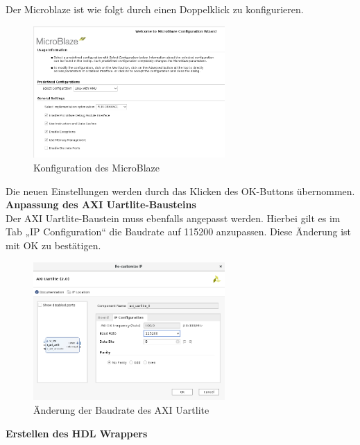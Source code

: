   Der Microblaze ist wie folgt durch einen Doppelklick zu konfigurieren.

\begin{figure}[H]
\centering
\includegraphics[width=0.65\textwidth]{Hauptteil/microkonf.png}
\caption{Konfiguration des MicroBlaze}\label{fig:mbschritt9}
\end{figure}
Die neuen Einstellungen werden durch das Klicken des OK-Buttons übernommen.\\

\textbf{Anpassung des AXI Uartlite-Bausteins}\\

Der AXI Uartlite-Baustein muss ebenfalls angepasst werden. Hierbei gilt es im Tab „IP Configuration“ die Baudrate auf 115200 anzupassen.
Diese Änderung ist mit OK zu bestätigen.\\

\begin{figure}[H]
\centering
\includegraphics[width=0.65\textwidth]{Hauptteil/Schritt10.png}
\caption{Änderung der Baudrate des AXI Uartlite}\label{fig:mbschritt10}
\end{figure}

\vspace{10mm}

\textbf{Erstellen des HDL Wrappers}\\

